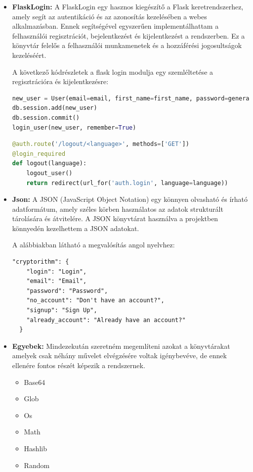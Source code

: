 \begin{itemize}
 	 \item\textbf{FlaskLogin:}
A FlaskLogin egy hasznos kiegészítő a Flask keretrendszerhez, amely segít az autentikáció és az azonosítás kezelésében a webes alkalmazásban. Ennek segítségével egyszerűen implementálhattam a felhasználói regisztrációt, bejelentkezést és kijelentkezést a rendszerben. Ez a könyvtár felelős a felhasználói munkamenetek és a hozzáférési jogosultságok kezeléséért.

A következő kódrészletek a flask login modulja egy szemléltetése a regisztrációra és kijelentkezésre:
\begin{lstlisting}[caption={Flask bejelentkezés kódrészlet}, captionpos=b, language = Python]
new_user = User(email=email, first_name=first_name, password=generate_password_hash(password1, method='sha256'))
db.session.add(new_user)
db.session.commit()
login_user(new_user, remember=True)
\end{lstlisting}

\begin{lstlisting}[caption={Flask kijelentkezés kódrészlet}, captionpos=b, language = Python]
@auth.route('/logout/<language>', methods=['GET'])
@login_required
def logout(language):
    logout_user()
    return redirect(url_for('auth.login', language=language))
\end{lstlisting}

 	 \item\textbf{Json:}
A JSON (JavaScript Object Notation) egy könnyen olvasható és írható adatformátum, amely széles körben használatos az adatok strukturált tárolására és átvitelére. A JSON könyvtárat használva a projektben könnyedén kezelhettem a JSON adatokat.

A alábbiakban látható a megvalósítás angol nyelvhez:
\begin{lstlisting}[caption={JSON angol kódrészlet}, captionpos=b]
"cryptorithm": {
    "login": "Login",
    "email": "Email",
    "password": "Password",
    "no_account": "Don't have an account?",
    "signup": "Sign Up",
    "already_account": "Already have an account?"
  }
\end{lstlisting}

\pagebreak
	 \item\textbf{Egyebek:}
Mindezekután szeretném megemlíteni azokat a könyvtárakat amelyek csak néhány művelet elvégzésére voltak igénybevéve, de ennek ellenére fontos részét képezik a rendszernek.
\begin{itemize}
 	 \item{Base64}
 	 \item{Glob}
 	 \item{Os}
 	 \item{Math}
 	 \item{Hashlib}
 	 \item{Random}
\end{itemize}
\end{itemize}


